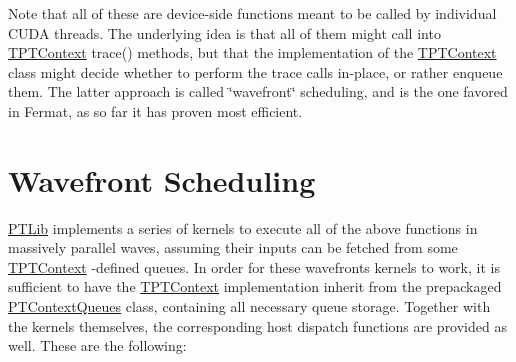 \begin{DoxyParagraph}{}
Note that all of these are device-\/side functions meant to be called by individual C\+U\+DA threads. The underlying idea is that all of them might call into \hyperlink{_p_t_lib_page_TPTContext}{T\+P\+T\+Context} trace() methods, but that the implementation of the \hyperlink{_p_t_lib_page_TPTContext}{T\+P\+T\+Context} class might decide whether to perform the trace calls in-\/place, or rather enqueue them. The latter approach is called \char`\"{}wavefront\char`\"{} scheduling, and is the one favored in Fermat, as so far it has proven most efficient.
\end{DoxyParagraph}
\hypertarget{_p_t_lib_page_PTWavefrontSchedulingSection}{}\section{Wavefront Scheduling}\label{_p_t_lib_page_PTWavefrontSchedulingSection}
\begin{DoxyParagraph}{}
\hyperlink{group___p_t_lib}{P\+T\+Lib} implements a series of kernels to execute all of the above functions in massively parallel waves, assuming their inputs can be fetched from some \hyperlink{_p_t_lib_page_TPTContext}{T\+P\+T\+Context} -\/defined queues. In order for these wavefronts kernels to work, it is sufficient to have the \hyperlink{_p_t_lib_page_TPTContext}{T\+P\+T\+Context} implementation inherit from the prepackaged \hyperlink{struct_p_t_context_queues}{P\+T\+Context\+Queues} class, containing all necessary queue storage. Together with the kernels themselves, the corresponding host dispatch functions are provided as well. These are the following\+:
\end{DoxyParagraph}

